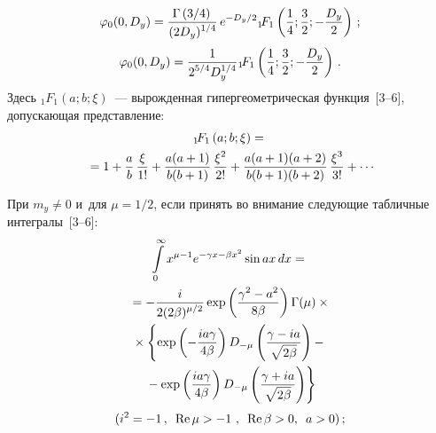 \begin{multicols}{2}
{\columnbreak

\noindent
    $$
    \varphi_0 (0, D_y)= \fr{\Gamma \left({3/4}\right)}{(2 D_y)^{1/4}}\,
    e^{-D_y/2} {}_1\!F_1\left(\fr{1}{4}; \fr{3}{2};- \fr{D_y}{2}\right)\,;
    $$
    $$
    \varphi_0 (0, D_y)= \fr{1}{2^{5/4} D_y^{1/4}}
      {}_1\!F_1\left(\fr{1}{4}; \fr{3}{2};- \fr{D_y}{2}\right)\,.
      $$
Здесь $ {}_1\!F_1\left(a; b; \xi\right)$~--- вырожденная гипергеометрическая 
функция~[3--6], допускающая представление:
   \begin{multline*}
    {}_1\!F_1\left(a; b; \xi\right) ={}\\
    {}= 1 + \fr{a}{b}\,\fr{\xi}{1!} + 
    \fr{a(a+1)}{b(b+1)} \,\fr{\xi^2}{2!} + 
    \fr{a(a+1)(a+2)}{b(b+1)(b+2)}\,\fr {\xi^3}{3!} +\cdots
    \end{multline*}

При $m_y \ne 0$ и~для $\mu=1/2$, если принять во внимание следующие 
табличные интегралы~[3--6]:
  \begin{multline*}
  \iii_0^\infty x^{\mu-1} e^{-\gamma x-\beta x^2} \sin a x \,dx = {}\\
  {}=
  -\fr{i}{2(2\beta)^{\mu/2}}\exp\left(
  \fr{\gamma^2-a^2}{8\beta}\right) \Gamma(\mu) \times{}\\
{}\times\left\{ \exp\left(-
\fr{ia\gamma}{4\beta}\right) D_{-\mu} \left( \fr{\gamma-ia}{\sqrt{2\beta}}\right)-{}\right.\\
\left.{}-
\exp\left(\fr{ia\gamma}{4\beta}\right) D_{-\mu} \left(
\fr{\gamma+ia}{\sqrt{2\beta}}\right)\right\}
\end{multline*}
      $$
      (i^2=-1\,,\enskip \mathrm{Re}\, \mu >-1\ ,\enskip \mathrm{Re}\, \beta>0,\enskip 
      a>0)\,;
      $$

\vspace*{-10pt}

}
\end{multicols}
